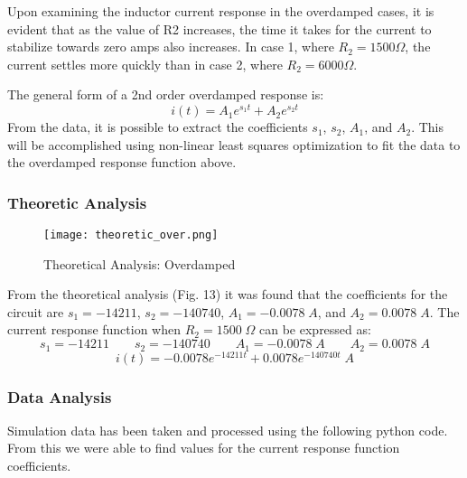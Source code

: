 \documentclass[11pt]{article}
\begin{document}
Upon examining the inductor current response in the overdamped cases, it is evident that as the value of R2 increases, the time it takes for the current to stabilize towards zero amps also increases. In case 1, where $R_2 = 1500 \Omega$, the current settles more quickly than in case 2, where $R_2 = 6000 \Omega$.

\noindent The general form of a 2nd order overdamped response is:
$$i(t) = A_1e^{s_1t} + A_2e^{s_2t}$$
From the data, it is possible to extract the coefficients $s_1$, $s_2$, $A_1$, and $A_2$. This will be accomplished using non-linear least squares optimization to fit the data to the overdamped response function above.

\subsubsection*{\textcolor{mycolor}{Theoretic Analysis}}
\begin{figure}[H]
  \centering
  \texttt{[image: theoretic\_over.png]}
  \caption{Theoretical Analysis: Overdamped}
  \label{fig:8}
\end{figure}
From the theoretical analysis (Fig. 13) it was found that the coefficients for the circuit are $s_1 = -14211$, $s_2=-140740$, $A_1 = -0.0078\;A$, and $A_2 = 0.0078\;A$. The current response function when $R_2=1500\;\Omega$ can be expressed as:
$$s_1 = -14211 \qquad s_2 = -140740 \qquad A_1 = -0.0078 \;A \qquad A_2 = 0.0078 \;A$$
$$i(t) = -0.0078e^{-14211t}+0.0078e^{-140740t} \;A$$
\subsubsection*{\textcolor{mycolor}{Data Analysis}}
Simulation data has been taken and processed using the following python code. From this we were able to find values for the current response function coefficients.
\end{document}
